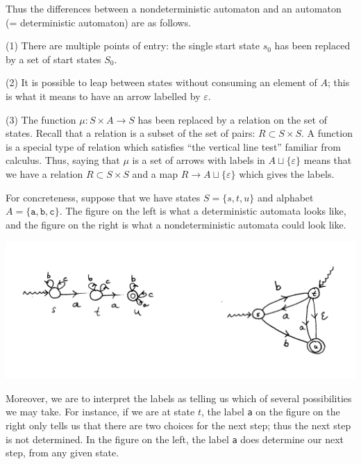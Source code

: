 \begin{ap} Thus the differences between a nondeterministic automaton
    and an automaton (= deterministic automaton) are as follows.

    (1) There are multiple points of entry: the single start state
    $s_0$ has been replaced by a set of start states $S_0$.

    (2) It is possible to leap between states without consuming an
    element of $A$; this is what it means to have an arrow labelled by
    $\varepsilon.$

    (3) The function $\mu : S\times A \rightarrow S$ has been replaced
    by a relation on the set of states. Recall that a relation is a
    subset of the set of pairs: $R \subset S\times S$. A function is a special
    type of relation which satisfies ``the vertical line test''
    familiar from calculus. Thus, saying that $\mu$ is a set of arrows
    with labels in $A\sqcup \{\varepsilon\}$ means that we have a
    relation $R \subset S\times S$ and a map $R \rightarrow A\sqcup
    \{\varepsilon\}$ which gives the labels.

    For concreteness, suppose that we have states $S = \{s,t,u\}$ and
    alphabet $A=\mathtt{\{a,b,c\}}$. The figure on the left is what a
    deterministic automata looks like, and the figure on the
    right is what a nondeterministic automata could look like.

    \begin{center}
        \includegraphics[scale=0.2]{resources/DFA-vs-NFA.pdf}
    \end{center}

    Moreover, we are to interpret the labels as telling us which of
    several possibilities we may take. For instance, if we are at
    state $t$, the label \texttt{a} on the figure on the right only
    tells us that there are two choices for the next step; thus the
    next step is not determined. In the figure on the left, the label
    \texttt{a} does determine our next step, from any given state.
\end{ap}

